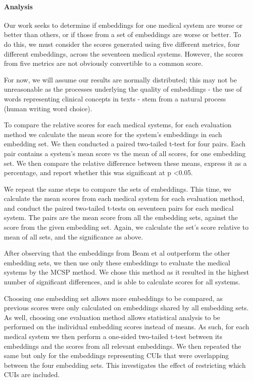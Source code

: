 \documentclass[10pt]{article}
\begin{document}
\paragraph{Analysis}
Our work seeks to determine if embeddings for one medical system are worse or better than others, or if those from a set of embeddings are worse or better. To do this, we must consider the scores generated using five different metrics, four different embeddings, across the seventeen medical systems. However, the scores from five metrics are not obviously convertible to a common score.  

For now, we will assume our results are normally distributed; this may not be unreasonable as the processes underlying the quality of embeddings - the use of words representing clinical concepts in texts - stem from a natural process (human writing word choice).

To compare the relative scores for each medical systems, for each evaluation method we calculate the mean score for the system's embeddings in each embedding set. We then conducted a paired two-tailed t-test for four pairs. Each pair contains a system's mean score vs the mean of all scores, for one embedding set. We then compare the relative difference between these means, express it as a percentage, and report whether this was significant at p \textless 0.05. 

We repeat the same steps to compare the sets of embeddings. This time, we calculate the mean scores from each medical system for each evaluation method, and conduct the paired two-tailed t-tests on seventeen pairs for each medical system. The pairs are the mean score from all the embedding sets, against the score from the given embedding set. Again, we calculate the set's score relative to mean of all sets, and the significance as above. 

After observing that the embeddings from Beam et al outperform the other embedding sets, we then use only these embeddings to evaluate the medical systems by the MCSP method. We chose this method  as it resulted in the highest number of significant differences, and is able to calculate scores for all systems. 

Choosing one embedding set allows more embeddings to be compared, as previous scores were only calculated on embeddings shared by all embedding sets. As well, choosing one evaluation method  allows statistical analysis to be performed on the individual embedding scores instead of means. As such, for each medical system we then perform a one-sided two-tailed t-test between its embeddings and the scores from all relevant embeddings. We then repeated the same but only for the embeddings representing CUIs that were overlapping between the four embedding sets. This investigates the effect of restricting which CUIs are included.  
\end{document}
